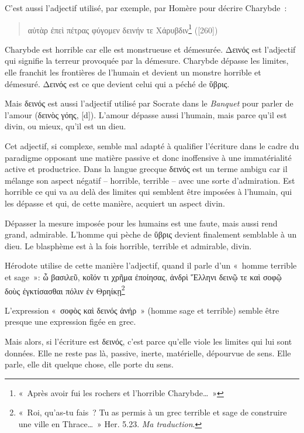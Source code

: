 C'est aussi l'adjectif utilisé, par exemple, par Homère pour décrire
Charybde~:

\begin{quote}
αὐτὰρ ἐπεὶ πέτρας φύγομεν δεινήν τε Χάρυβδιν\footnote{«~Après avoir fui
  les rochers et l'horrible Charybde\ldots~»} ([260])
\end{quote}

Charybde est horrible car elle est monstrueuse et démesurée. Δεινός est
l'adjectif qui signifie la terreur provoquée par la démesure. Charybde
dépasse les limites, elle franchit les frontières de l'humain et devient
un monstre horrible et démesuré. Δεινός est ce que devient celui qui a
péché de ὕβρις.

Mais δεινός est aussi l'adjectif utilisé par Socrate dans le
\emph{Banquet} pour parler de l'amour (δεινὸς γόης,
[d]). L'amour dépasse aussi l'humain, mais parce
qu'il est divin, ou mieux, qu'il est un dieu.

Cet adjectif, si complexe, semble mal adapté à qualifier l'écriture dans
le cadre du paradigme opposant une matière passive et donc inoffensive à
une immatérialité active et productrice. Dans la langue grecque δεινός
est un terme ambigu car il mélange son aspect négatif -- horrible,
terrible -- avec une sorte d'admiration. Est horrible ce qui va au delà
des limites qui semblent être imposées à l'humain, qui les dépasse et
qui, de cette manière, acquiert un aspect divin.

Dépasser la mesure imposée pour les humains est une faute, mais aussi
rend grand, admirable. L'homme qui pèche de ὕβρις devient finalement
semblable à un dieu. Le blasphème est à la fois horrible, terrible et
admirable, divin.

Hérodote utilise de cette manière l'adjectif, quand il parle d'un
«~homme terrible et sage~»: ὦ βασιλεῦ, κοῖόν τι χρῆμα ἐποίησας, ἀνδρὶ
Ἕλληνι δεινῷ τε καὶ σοφῷ δοὺς ἐγκτίσασθαι πόλιν ἐν Θρηίκῃ\footnote{«~Roi,
  qu'as-tu fais~? Tu as permis à un grec terrible et sage de construire
  une ville en Thrace\ldots~» Her. 5.23. \emph{Ma traduction}.}

L'expression «~σοφὸς καὶ δεινός ἀνήρ~» (homme sage et terrible) semble
être presque une expression figée en grec.

Mais alors, si l'écriture est δεινός, c'est parce qu'elle viole les
limites qui lui sont données. Elle ne reste pas là, passive, inerte,
matérielle, dépourvue de sens. Elle parle, elle dit quelque chose, elle
porte du sens.

